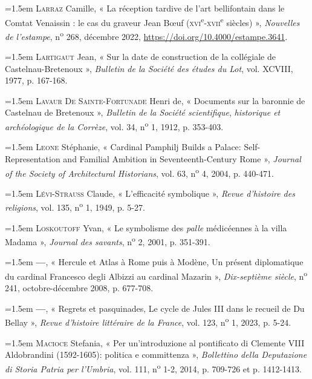 \documentclass[12pt,twoside,openany]{book}
\newenvironment{PurhBibliography}
  {%
    \par
    \setlength{\parindent}{0pt}%
    \setlength{\leftskip}{0pt}%
  }
  {%
    \par
  }
\begin{document}
\begin{PurhBibliography}
\noindent\hangindent=1.5em \textsc{Larraz} Camille, « La réception tardive de l’art bellifontain dans le Comtat Venaissin : le cas du graveur Jean Bœuf (\textsc{xvi}\textsuperscript{e}-\textsc{xvii}\textsuperscript{e} siècles) », \textit{Nouvelles de l’estampe}, n\textsuperscript{o} 268, décembre 2022, \href{https://doi.org/10.4000/estampe.3641}{https://doi.org/10.4000/estampe.3641}.\par
\noindent\hangindent=1.5em \textsc{Lartigaut} Jean, « Sur la date de construction de la collégiale de Castelnau-Bretenoux », \textit{Bulletin de la Société des études du Lot}, vol. XCVIII, 1977, p. 167-168.\par
\noindent\hangindent=1.5em \textsc{Lavaur De Sainte}-\textsc{Fortunade} Henri de, « Documents sur la baronnie de Castelnau de Bretenoux », \textit{Bulletin de la Société scientifique},\textit{ historique et archéologique de la Corrèze}, vol. 34, n\textsuperscript{o} 1, 1912, p. 353-403.\par
\noindent\hangindent=1.5em \textsc{Leone} Stéphanie, « Cardinal Pamphilj Builds a Palace: Self-Representation and Familial Ambition in Seventeenth-Century Rome », \textit{Journal of the Society of Architectural Historians}, vol. 63, n\textsuperscript{o} 4, 2004, p. 440-471.\par
\noindent\hangindent=1.5em \textsc{Lévi}-\textsc{Strauss} Claude, « L’efficacité symbolique », \textit{Revue d’histoire des religions}, vol. 135, n\textsuperscript{o} 1, 1949, p. 5-27.\par
\noindent\hangindent=1.5em \textsc{Loskoutoff} Yvan, « Le symbolisme des \textit{palle} médicéennes à la villa Madama », \textit{Journal des savants}, n\textsuperscript{o} 2, 2001, p. 351-391.\par
\noindent\hangindent=1.5em \textbf{—}, « Hercule et Atlas à Rome puis à Modène, Un présent diplomatique du cardinal Francesco degli Albizzi au cardinal Mazarin », \textit{Dix-septième siècle}, n\textsuperscript{o} 241, octobre-décembre 2008, p. 677-708.\par
\noindent\hangindent=1.5em \textbf{—}, « Regrets et pasquinades, Le cycle de Jules \textsc{III} dans le recueil de Du Bellay », \textit{Revue d’histoire littéraire de la France}, vol. 123, n\textsuperscript{o} 1, 2023, p. 5-24.\par
\noindent\hangindent=1.5em \textsc{Macioce} Stefania, « Per un’introduzione al pontificato di Clemente \textsc{VIII} Aldobrandini (1592-1605): politica e committenza », \textit{Bollettino della Deputazione di Storia Patria per l’Umbria}, vol. 111, n\textsuperscript{o} 1-2, 2014, p. 709-726 et p. 1412-1413.\par

\end{PurhBibliography}
\end{document}
